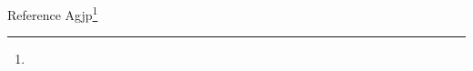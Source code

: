 \documentclass[degree-level=master,fontset=fandol]{hithesis}
\begin{document}
\mainmatter
\noindent Reference Agjp\footnote{\LongNoteBody}\par
\end{document}
